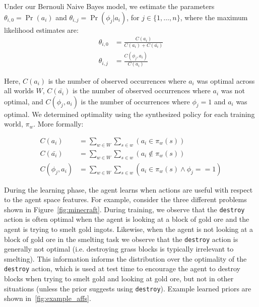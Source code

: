 \documentclass[11pt]{article}
\begin{document}
Under our Bernouli Naive Bayes model, we estimate the parameters
$\theta_{i,0} = \Pr(a_i)$ and $\theta_{i,j} = \Pr(\phi_j | a_i)$, for $j \in \{1, \ldots, n \}$, where the maximum likelihood estimates are:
\begin{align}
\theta_{i,0} &= \frac{C(a_i)}{C(a_i) + C(\bar{a_i})} \\
\theta_{i,j} &= \frac{C(\phi_j, a_i)}{C(a_i)}
\end{align}

Here, $C(a_i)$ is the number of observed occurrences where $a_i$ was optimal across all worlds $W$,
$C(\bar{a_i})$ is the number of observed occurrences where $a_i$ was not optimal,
and $C(\phi_j, a_i)$ is the number of occurrences where $\phi_j=1$ and $a_i$ was optimal.
We determined optimality using the synthesized policy for each training world, $\pi_w$. More formally:

\begin{align}
C(a_i) &= \sum_{w \in W} \sum_{s \in w} (a_i \in \pi_w(s)) \\
C(\bar{a_i}) &= \sum_{w \in W} \sum_{s \in w} (a_i \not \in \pi_w(s) ) \\
C(\phi_j, a_i) &= \sum_{w \in W} \sum_{s \in w} (a_i  \in \pi_w(s) \wedge \phi_j == 1)
\end{align}

During the learning phase, the agent learns when actions are useful
with respect to the agent space features.  For example, consider the three different
problems shown in Figure~\ref{fig:minecraft}.  During training, we observe
that the \texttt{destroy} action is often optimal when the agent is
looking at a block of gold ore and the agent is trying to smelt gold
ingots.  Likewise, when the agent is not looking at a block of gold
ore in the smelting task we observe that the \texttt{destroy} action
is generally not optimal (i.e. destroying grass blocks is typically
irrelevant to smelting).  This information informs the distribution
over the optimality of the \texttt{destroy} action, which is used at
test time to encourage the agent to destroy blocks when trying to
smelt gold and looking at gold ore, but not in other situations
(unless the prior suggests using \texttt{destroy}). Example
learned priors are shown in~\ref{fig:example_affs}.
\end{document}
